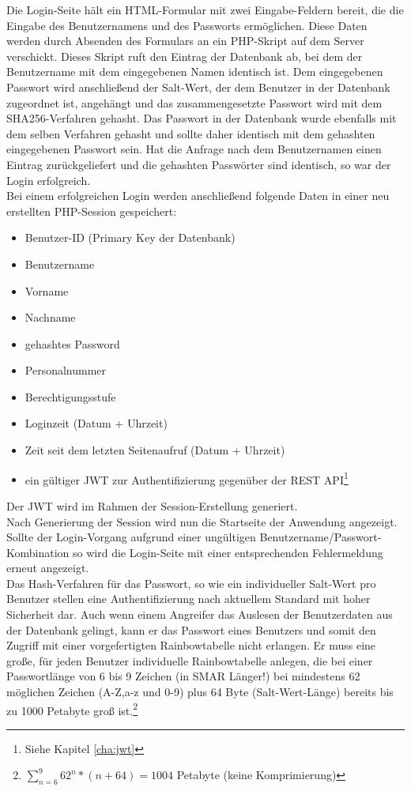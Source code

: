 Die Login-Seite hält ein \ac{HTML}-Formular mit zwei Eingabe-Feldern bereit, die die Eingabe des Benutzernamens und des Passworts ermöglichen. Diese Daten werden durch Absenden des Formulars an ein \ac{PHP}-Skript auf dem Server verschickt. Dieses Skript ruft den Eintrag der Datenbank ab, bei dem der Benutzername mit dem eingegebenen Namen identisch ist. Dem eingegebenen Passwort wird anschließend der Salt-Wert, der dem Benutzer in der Datenbank zugeordnet ist, angehängt und das zusammengesetzte Passwort wird mit dem SHA256-Verfahren gehasht. Das Passwort in der Datenbank wurde ebenfalls mit dem selben Verfahren gehasht und sollte daher identisch mit dem gehashten eingegebenen Passwort sein. Hat die Anfrage nach dem Benutzernamen einen Eintrag zurückgeliefert und die gehashten Passwörter sind identisch, so war der Login erfolgreich.\\
Bei einem erfolgreichen Login werden anschließend folgende Daten in einer neu erstellten \ac{PHP}-Session gespeichert:
\begin{itemize}
	\item Benutzer-ID (Primary Key der Datenbank)
	\item Benutzername
	\item Vorname
	\item Nachname
	\item gehashtes Password
	\item Personalnummer
	\item Berechtigungsstufe
	\item Loginzeit (Datum + Uhrzeit)
	\item Zeit seit dem letzten Seitenaufruf (Datum + Uhrzeit)
	\item ein gültiger \ac{JWT} zur Authentifizierung gegenüber der \ac{REST} \ac{API}\footnote{Siehe Kapitel \ref{cha:jwt} }
\end{itemize}
Der \ac{JWT} wird im Rahmen der Session-Erstellung generiert.\\
Nach Generierung der Session wird nun die Startseite der Anwendung angezeigt.\\
Sollte der Login-Vorgang aufgrund einer ungültigen Benutzername/Passwort-Kombination so wird die Login-Seite mit einer entsprechenden Fehlermeldung erneut angezeigt.\\

Das Hash-Verfahren für das Passwort, so wie ein individueller Salt-Wert pro Benutzer stellen eine Authentifizierung nach aktuellem Standard mit hoher Sicherheit dar. Auch wenn einem Angreifer das Auslesen der Benutzerdaten aus der Datenbank gelingt, kann er das Passwort eines Benutzers und somit den Zugriff mit einer vorgefertigten Rainbowtabelle nicht erlangen. Er muss eine große, für jeden Benutzer individuelle Rainbowtabelle anlegen, die bei einer Passwortlänge von 6 bis 9 Zeichen (in \ac{SMAR} Länger!) bei mindestens 62 möglichen Zeichen (A-Z,a-z und 0-9) plus 64 Byte (Salt-Wert-Länge) bereits bis zu 1000 Petabyte groß ist.\footnote{$\sum_{n=6}^{9} 62^{n}*(n+64)=1004$ Petabyte (keine Komprimierung)}\\

